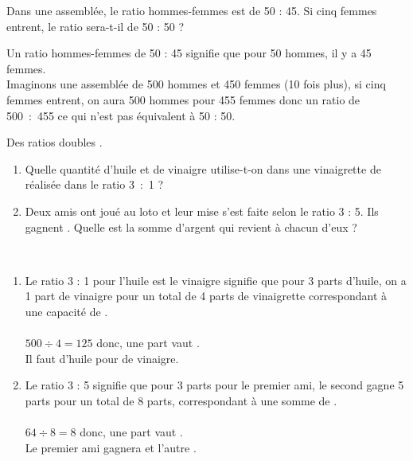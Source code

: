 \begin{colonne*exercice}
\bigskip


\begin{exercice} %
   Dans une assemblée, le ratio hommes-femmes est de 50 : 45. Si cinq femmes entrent, le ratio sera-t-il de 50 : 50 ?
\end{exercice}

\begin{corrige}
   Un ratio hommes-femmes de 50 : 45 signifie que pour 50 hommes, il y a 45 femmes. \\
   Imaginons une assemblée de 500 hommes et 450 femmes (10 fois plus), si cinq femmes entrent, on aura 500 hommes pour 455 femmes donc un ratio de 500~:~455 ce qui n'est {\blue pas équivalent à 50 : 50.}
\end{corrige}

\bigskip


\begin{exercice} %
   Des ratios \og doubles \fg.
      \begin{enumerate}
         \item Quelle quantité d'huile et de vinaigre utilise-t-on dans une vinaigrette de  réalisée dans le ratio 3~:~1 ?
         \item Deux amis ont joué au loto et leur mise s'est faite selon le ratio 3 : 5. Ils gagnent . Quelle est la somme d'argent qui revient à chacun d'eux ?
   \end{enumerate}
\end{exercice}

\begin{corrige}
\ \\ [-5mm]
   \begin{enumerate}
      \item Le ratio 3 : 1 pour l'huile est le vinaigre signifie que pour 3 parts d'huile, on a 1 part de vinaigre pour un total de 4 parts de vinaigrette correspondant à une capacité de . \\ [2mm]
            \qquad {} \\
         $500\div4 =125$ donc, une part vaut . \\
         Il faut {\blue {} d'huile pour  de vinaigre.}        
      \item Le ratio 3 : 5 signifie que pour 3 parts pour le premier ami, le second gagne 5 parts pour un total de 8 parts, correspondant à une somme de . \\ [2mm]
            \qquad {} \\
            $64\div8 =8$ donc, une part vaut . \\
            {\blue Le premier ami gagnera  et l'autre .}
   \end{enumerate}
\end{corrige}


\end{colonne*exercice}
